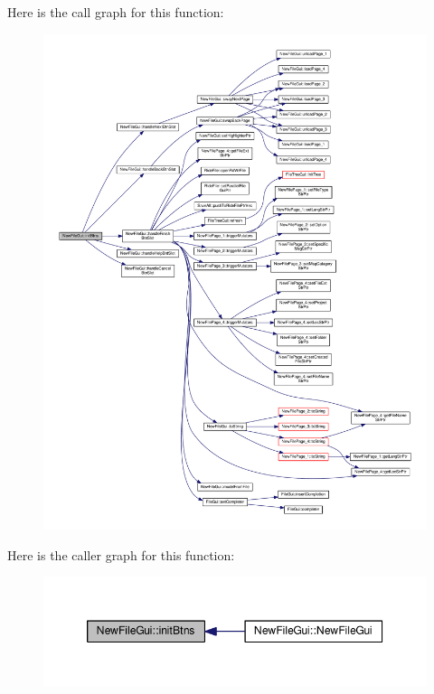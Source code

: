 Here is the call graph for this function\-:
\nopagebreak
\begin{figure}[H]
\begin{center}
\leavevmode
\includegraphics[width=350pt]{class_new_file_gui_ad77edffa59956f16ef2b6d83dd357932_cgraph}
\end{center}
\end{figure}




Here is the caller graph for this function\-:
\nopagebreak
\begin{figure}[H]
\begin{center}
\leavevmode
\includegraphics[width=350pt]{class_new_file_gui_ad77edffa59956f16ef2b6d83dd357932_icgraph}
\end{center}
\end{figure}



